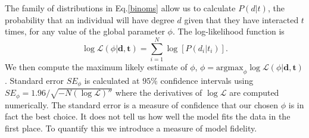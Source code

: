 \documentclass[10pt]{article}
\begin{document}
\begin{multicols}{2}
The family of distributions in Eq.\eqref{binoms} allow us to calculate $P(d|t)$, the probability that an individual will have degree $d$ given that they have interacted $t$ times, for any value of the global parameter $\phi$. The log-likelihood function is
\begin{equation}
\log \mathcal{L}(\phi|\textbf{d},\textbf{t})=\sum_{i=1}^{N}\log[P(d_{i}|t_{i})].
\end{equation}
We then compute the maximum likely estimate of $\phi$, $\phi=\text{argmax}_{\phi}\log \mathcal{L}(\phi|\textbf{d},\textbf{t})$. Standard error $SE_{\phi}$ is calculated at $95\%$ confidence intervals using $SE_{\phi}=1.96/\sqrt{-N(\log \mathcal{L})''}$ where the derivatives of $\log \mathcal{L}$ are computed numerically. The standard error is a measure of confidence that our chosen $\phi$ is in fact the best choice. It does not tell us how well the model fits the data in the first place. To quantify this we introduce a measure of model fidelity.


\end{multicols}
\end{document}
